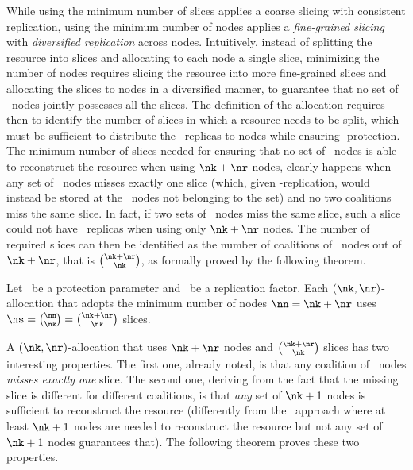   
While using the minimum number of slices applies a coarse slicing with
consistent replication, using the minimum number of nodes applies a
{\em fine-grained slicing} with {\em diversified replication} across
nodes. Intuitively, instead of splitting the resource into slices and
allocating to each node a single slice, minimizing the number of nodes
requires slicing the resource into more fine-grained slices and
allocating the slices to nodes in a diversified manner, to guarantee
that no set of \nk\ nodes jointly possesses all the slices.  The
definition of the allocation requires then to identify the number of
slices in which a resource needs to be split, which must be sufficient
to distribute the \nr\ replicas to nodes while ensuring
\nk-protection. The minimum number of slices needed for ensuring that
no set of \nk\ nodes is able to reconstruct the resource when using
$\nk+\nr$ nodes, clearly happens when any set of \nk\ nodes misses
exactly one slice (which, given \nr-replication, would instead be
stored at the \nr\ nodes not belonging to the set) and no two
coalitions miss the same slice. In fact, if two sets of \nk\ nodes
miss the same slice, such a slice could not have \nr\ replicas when
using only $\nk+\nr$ nodes. The number of required slices can then be
identified as the number of coalitions of \nk\ nodes out of $\nk+\nr$,
that is $\binom{\nk+\nr}{\nk}$, as formally proved by the following
theorem.


\smallskip
\begin{theorem}\label{dcs:theo:numslices}
Let \nk\ be a protection parameter and \nr\ be a replication
factor. Each $(\nk,\nr)$-allocation that adopts the minimum number of
nodes $\nn = \nk+\nr$ uses $\ns=\binom{\nn}{\nk}=\binom{\nk+\nr}{\nk}$
slices.
\end{theorem}
\smallskip

A $(\nk,\nr)$-allocation that uses $\nk+\nr$ nodes and
$\binom{\nk+\nr}{\nk}$ slices has two interesting properties. The
first one, already noted, is that any coalition of \nk\ nodes {\em
  misses exactly one} slice. The second one, deriving from the fact
that the missing slice is different for different coalitions, is that
{\em any\/} set of $\nk+1$ nodes is sufficient to reconstruct the
resource (differently from the \Diagonal\ approach where at least
$\nk+1$ nodes are needed to reconstruct the resource but not any set
of $\nk+1$ nodes guarantees that). The following theorem proves these
two properties.



